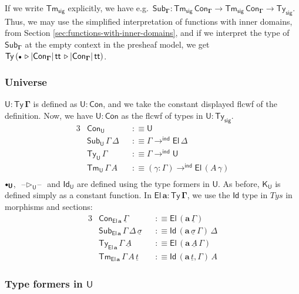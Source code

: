\documentclass[12pt,a4paper,twoside,openany]{book}
\theoremstyle{remark}
\theoremstyle{definition}
\theoremstyle{theorem}
\newcommand{\ms}[1]{\mathsf{#1}}
\newcommand{\bs}[1]{\boldsymbol{#1}}
\newcommand{\toind}{\to^{\ms{ind}}}
\newcommand{\Tys}{\ms{Ty_{sig}}}
\newcommand{\Tms}{\ms{Tm_{sig}}}
\newcommand{\Con}{\mathsf{Con}}
\newcommand{\Sub}{\mathsf{Sub}}
\newcommand{\Tm}{\mathsf{Tm}}
\newcommand{\Ty}{\mathsf{Ty}}
\newcommand{\U}{\mathsf{U}}
\newcommand{\El}{\mathsf{El}}
\newcommand{\Id}{\mathsf{Id}}
\renewcommand{\tt}{\mathsf{tt}}
\newcommand{\blank}{\mathord{\hspace{1pt}\text{--}\hspace{1pt}}}
\newcommand{\ext}{\triangleright}
\newcommand{\emptycon}{\scaleobj{.75}\bullet}
\newcommand{\K}{\mathsf{K}}
\newcommand{\bCon}{\bs{\Con}}
\newcommand{\bTy}{\bs{\Ty}}
\newcommand{\bGamma}{\bs{\Gamma}}
\newcommand{\ba}{\bs{a}}
\newcommand{\bU}{\bs{\U}}
\newcommand{\bEl}{\bs{\El}}
\newcommand{\ul}[1]{\underline{#1}}
\newcommand{\ulGamma}{\ul{\Gamma}}
\newcommand{\ulsigma}{\ul{\sigma}}
\newcommand{\ult}{\ul{t}}
\newcommand{\ulA}{\ul{A}}
\newcommand{\defn}{:\equiv}
\begin{document}
If we write $\Tms$ explicitly, we have e.g.\ $\Sub_{\bGamma} :
\Tms\,\Con_{\bGamma} \to \Tms\,\Con_{\bGamma} \to \Tys$. Thus, we may use the
simplified interpretation of functions with inner domains, from Section
\ref{sec:functions-with-inner-domains}, and if we interpret the type of
$\Sub_{\bGamma}$ at the empty context in the presheaf model, we get
$\Ty\,(\emptycon\,\ext|\Con_{\bGamma}|\,\tt\,\ext |\Con_{\bGamma}|\,\tt)$.

\subsubsection{Universe}

$\bU : \bTy\,\bGamma$ is defined as $\bU : \bCon$, and we take the constant
displayed flcwf of the definition. Now, we have $\bU : \bCon$ as the flcwf of
types in $\U : \Tys$.
\begin{alignat*}{3}
  &\Con_{\bU} && \defn \U \\
  &\Sub_{\bU}\,\Gamma\,\Delta && \defn \Gamma \toind \El\,\Delta\\
  &\Ty_{\bU}\,\Gamma && \defn \Gamma \toind \U\\
  &\Tm_{\bU}\,\Gamma\,A && \defn (\gamma : \Gamma) \toind \El\,(A\,\gamma)\\
\end{alignat*}
$\emptycon_{\bU}$, $\blank\ext_{\bU}\blank$ and $\Id_{\bU}$ are defined using
the type formers in $\U$. As before, $\K_{\bU}$ is defined simply as a constant
function.  In $\bEl\,\ba : \bTy\,\bGamma$, we use the $\Id$ type in $Tys$ in
morphisms and sections:
\begin{alignat*}{3}
  &\Con_{\bEl\,\ba}\,\ulGamma && \defn \El\,(\ba\,\ulGamma) \\
  &\Sub_{\bEl\,\ba}\,\Gamma\,\Delta\,\ulsigma && \defn \Id\,(\ba\,\ulsigma\,\Gamma)\,\Delta\\
  &\Ty_{\bEl\,\ba}\,\Gamma\,\ulA && \defn \El\,(\ba\,\ulA\,\Gamma)\\
  &\Tm_{\bEl\,\ba}\,\Gamma\,A\,\ult && \defn \Id\,(\ba\,\ult,\Gamma)\,A
\end{alignat*}

\subsubsection{Type formers in $\bU$}
\end{document}
